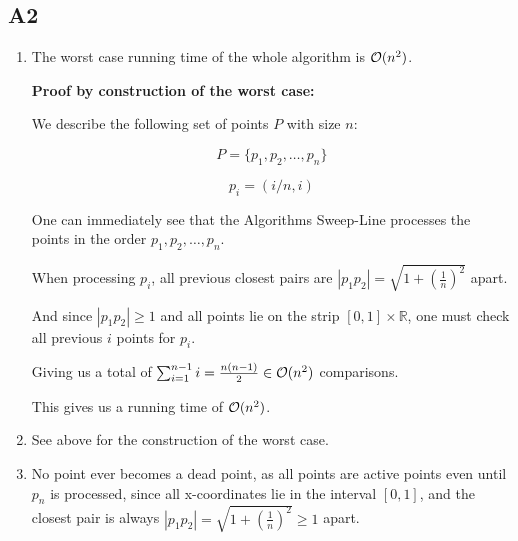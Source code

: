 \subsection{A2}


\begin{enumerate}[label=(\alph*)]
    \item The worst case running time of the whole algorithm is $\mathcal{O}(n^2)$.
    
    \textbf{Proof by construction of the worst case:}

    We describe the following set of points $P$ with size $n$:

    $$P = \{p_1, p_2, \ldots, p_n\}$$

    $$p_i = (i/n, i)$$

    One can immediately see that the Algorithms Sweep-Line processes the points in the order $p_1, p_2, \ldots, p_n$.

    When processing $p_i$, all previous closest pairs are $|p_1 p_2| = \sqrt{1+(\frac{1}{n})^2}$ apart.

    And since $|p_1 p_2| \geq 1$ and all points lie on the strip $[0, 1] \times \mathbb{R}$, one must check all previous $i$ points for $p_i$.

    Giving us a total of $\sum_{i=1}^{n-1} i = \frac{n(n-1)}{2} \in \mathcal{O}(n^2)$ comparisons.

    This gives us a running time of $\mathcal{O}(n^2)$.

    \item See above for the construction of the worst case.
    \item No point ever becomes a dead point, as all points are active points even until $p_n$ is processed, since all x-coordinates lie in the interval $[0, 1]$, and the closest pair is always $|p_1 p_2| = \sqrt{1+(\frac{1}{n})^2}\geq 1$ apart.
\end{enumerate}
